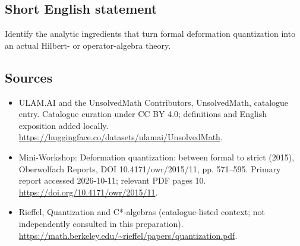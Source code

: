 \documentclass[11pt]{article}
\begin{document}
\subsection{Short English statement}
Identify the analytic ingredients that turn formal deformation quantization into an actual Hilbert- or operator-algebra theory.
\subsection{Sources}
\begin{itemize}
\item[\hypertarget{source:statement:1}{S1}] ULAM.AI and the UnsolvedMath Contributors, UnsolvedMath, catalogue entry. Catalogue curation under CC BY 4.0; definitions and English exposition added locally.
\url{https://huggingface.co/datasets/ulamai/UnsolvedMath}.
\item[\hypertarget{source:statement:2}{S2}] Mini-Workshop: Deformation quantization: between formal to strict (2015), Oberwolfach Reports, DOI 10.4171/owr/2015/11, pp. 571--595. Primary report accessed 2026-10-11; relevant PDF pages 10.
\url{https://doi.org/10.4171/owr/2015/11}.
\item[\hypertarget{source:statement:3}{S3}] Rieffel, Quantization and C*-algebras (catalogue-listed context; not independently consulted in this preparation).
\url{https://math.berkeley.edu/~rieffel/papers/quantization.pdf}.
\end{itemize}
\label{end:statement}
\end{document}
